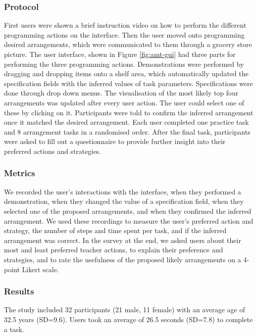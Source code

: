 \subsubsection{Protocol}
First users were shown a brief instruction video on how to perform the different programming actions on the interface.
Then the user moved onto programming desired arrangements, which were communicated to them through a grocery store picture.
The user interface, shown in Figure \ref{fig:amt-gui} had three parts for performing the three programming actions.
Demonstrations were performed by dragging and dropping items onto a shelf area, which automatically updated the specification fields with the inferred values of task parameters. 
Specifications were done through drop down menus.
The visualisation of the most likely top four arrangements was updated after every user action. 
The user could select one of these by clicking on it.
Participants were told to confirm the inferred arrangement once it matched the desired arrangement.
Each user completed one practice task and 8 arrangement tasks in a randomised order.
After the final task, participants were asked to fill out a questionnaire to provide further insight into their preferred actions and strategies. 

\subsubsection{Metrics}
We recorded the user's interactions with the interface, when they performed a demonstration, when they changed the value of a specification field, when they selected one of the proposed arrangements, and when they confirmed the inferred arrangement. 
We used these recordings to measure the user's preferred action and strategy, the number of steps and time spent per task, and if the inferred arrangement was correct.
In the survey at the end, we asked users about their most and least preferred teacher actions, to explain their preference and strategies, and to rate the usefulness of the proposed likely arrangements on a 4-point Likert scale.

\subsubsection{Results}
The study included 32 participants (21 male, 11 female) with an average age of 32.5 years (SD=9.6).
Users took an average of 26.5 seconds (SD=7.8) to complete a task.

